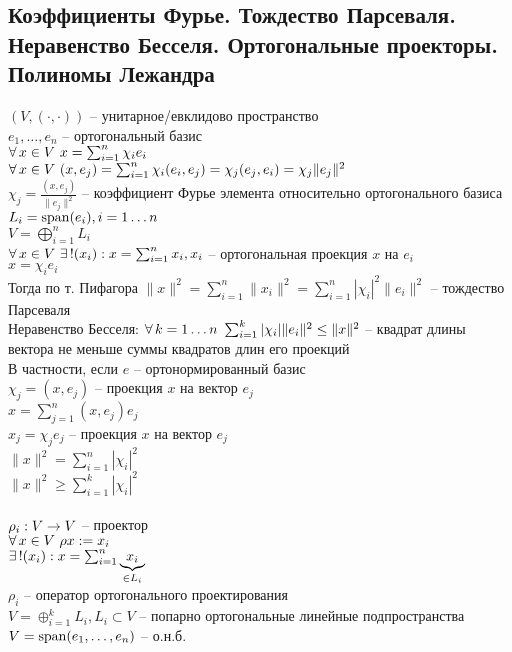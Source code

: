\documentclass[12pt]{article}
\begin{document}
\subsection{Коэффициенты Фурье. Тождество Парсеваля. Неравенство Бесселя. Ортогональные проекторы. Полиномы Лежандра}
$(V, (\cdot, \cdot))$ -- унитарное/евклидово пространство\\
$e_1, \ldots, e_n$ -- ортогональный базис\\
$\fall x\in V\ x=\sum_{i=1}^n \chi_ie_i$\\
$\fall x\in V\ (x, e_j)=\sum_{i=1}^n \chi_i(e_i, e_j) = \chi_j(e_j, e_i) = \chi_j\|e_j\|^2$\\
$\chi_j = \frac{(x, e_j)}{\|e_j\|^2}$ -- коэффициент Фурье элемента относительно ортогонального базиса\\
$L_i = \span(e_i), i = 1\ldots n$\\
$V = \bigoplus_{i=1}^n L_i$\\
$\fall x\in V\ \ex! (x_i): x = \sum_{i=1}^n x_i, x_i$ -- ортогональная проекция $x$ на $e_i$\\
$x = \chi_i e_i$\\
Тогда по т. Пифагора $\|x\|^2 = \sum_{i=1}^n \|x_i\|^2 = \sum_{i=1}^n |\chi_i|^2\|e_i\|^2$ -- тождество Парсеваля\\
Неравенство Бесселя: $\fall k=1\ldots n\ \sum_{i=1}^k |\chi_i|\|e_i\|^2 \leq \|x\|^2$ -- квадрат длины вектора не меньше суммы квадратов длин его проекций\\
В частности, если $e$ -- ортонормированный базис\\
$\chi_j = (x, e_j)$ -- проекция $x$ на вектор $e_j$\\
$x = \sum_{j=1}^n (x,e_j)e_j$\\
$x_j = \chi_j e_j$ -- проекция $x$ на вектор $e_j$\\
$\|x\|^2 = \sum_{i=1}^n |\chi_i|^2$\\
$\|x\|^2 \geq \sum_{i=1}^k |\chi_i|^2$\\\\
$\rho_i: V\rto V$ -- проектор\\
$\fall x \in V\ \rho x:= x_i$\\
$\ex! (x_i): x=\sum_{i=1}^n \ub{\in L_i}{x_i}$\\
$\rho_i$ -- оператор ортогонального проектирования\\
$V = \oplus_{i=1}^k L_i, L_i \subset V$ -- попарно ортогональные линейные подпространства\\
$V = \span(e_1, \ldots, e_n)$ -- о.н.б.\\
\end{document}
